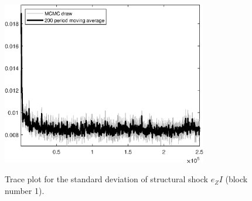 \begin{figure}[H]
\centering
  \includegraphics[width=0.8\textwidth]{BRS_extended_fd/graphs/TracePlot_SE_e_ZI_blck_1}\\
    \caption{Trace plot for the standard deviation of structural shock ${e_ZI}$ (block number 1).}
\end{figure}
